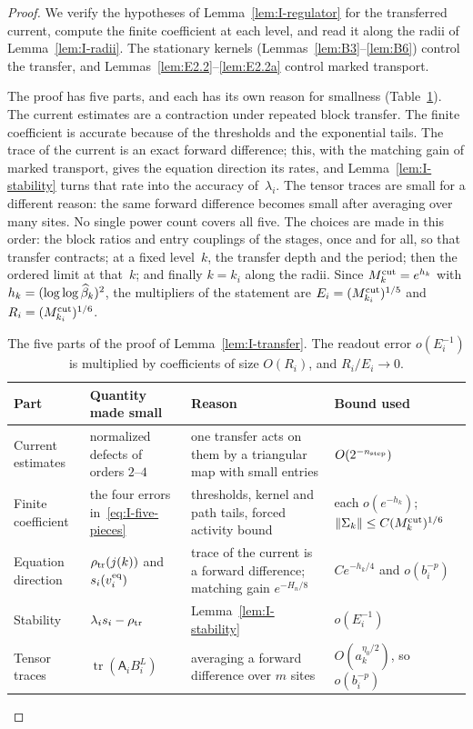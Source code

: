\begin{proof}
We verify the hypotheses of Lemma~\ref{lem:I-regulator} for the transferred current, compute the finite coefficient at each level, and read it along the radii of Lemma~\ref{lem:I-radii}. The stationary kernels (Lemmas~\ref{lem:B3}--\ref{lem:B6}) control the transfer, and Lemmas~\ref{lem:E2.2}--\ref{lem:E2.2a} control marked transport.

The proof has five parts, and each has its own reason for smallness (Table~\ref{tab:I-transfer-rates}). The current estimates are a contraction under repeated block transfer. The finite coefficient is accurate because of the thresholds and the exponential tails. The trace of the current is an exact forward difference; this, with the matching gain of marked transport, gives the equation direction its rates, and Lemma~\ref{lem:I-stability} turns that rate into the accuracy of~$\lambda_i$. The tensor traces are small for a different reason: the same forward difference becomes small after averaging over many sites. No single power count covers all five. The choices are made in this order: the block ratios and entry couplings of the stages, once and for all, so that transfer contracts; at a fixed level~$k$, the transfer depth and the period; then the ordered limit at that~$k$; and finally $k=k_i$ along the radii. Since $M^{\mathrm{cut}}_k=e^{h_k}$ with $h_k=(\log\log\widehat{\beta}_k)^2$, the multipliers of the statement are $E_i=(M^{\mathrm{cut}}_{k_i})^{1/5}$ and $R_i=(M^{\mathrm{cut}}_{k_i})^{1/6}$.

\begin{table}[ht]
\centering\small
\begin{tabular}{@{}lp{3.3cm}p{4.5cm}p{3.6cm}@{}}
\toprule
Part & Quantity made small & Reason & Bound used\\
\midrule
Current estimates & \raggedright normalized defects of orders $2$--$4$ & \raggedright one transfer acts on them by a triangular map with small entries & $O(2^{-n_{\rm step}})$\\
Finite coefficient & \raggedright the four errors in~\eqref{eq:I-five-pieces} & \raggedright thresholds, kernel and path tails, forced activity bound & each $o(e^{-h_k})$;\newline $\|\Sigma_k\|\le C(M^{\mathrm{cut}}_k)^{1/6}$\\
Equation direction & \raggedright $\rho_{\rm tr}(j(k))$ and $s_i(v_i^{\rm eq})$ & \raggedright trace of the current is a forward difference; matching gain $e^{-H_n/8}$ & $Ce^{-h_k/4}$ and $o(b_i^{-p})$\\
Stability & \raggedright $\lambda_is_i-\rho_{\rm tr}$ & \raggedright Lemma~\ref{lem:I-stability} & $o(E_i^{-1})$\\
Tensor traces & \raggedright $\operatorname{tr}(\mathsf A_iB_i^L)$ & \raggedright averaging a forward difference over $m$ sites & $O(a_k^{\eta_0/2})$, so $o(b_i^{-p})$\\
\bottomrule
\end{tabular}
\caption{The five parts of the proof of Lemma~\ref{lem:I-transfer}. The readout error $o(E_i^{-1})$ is multiplied by coefficients of size $O(R_i)$, and $R_i/E_i\to0$.}\label{tab:I-transfer-rates}
\end{table}


\end{proof}
